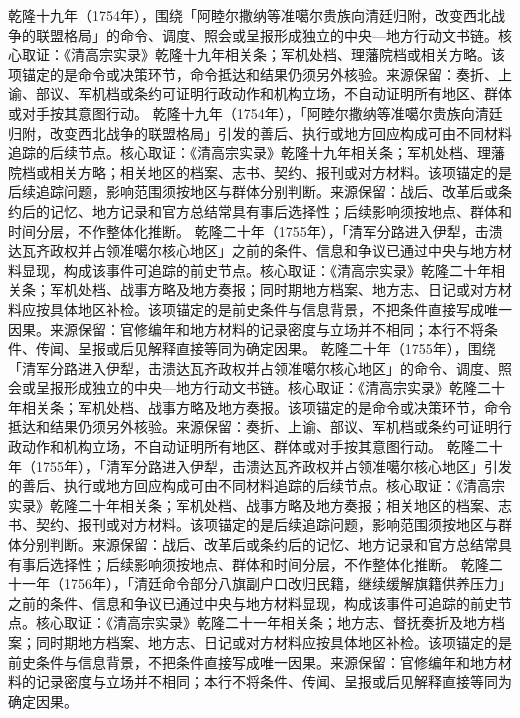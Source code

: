 乾隆十九年（1754年），围绕「阿睦尔撒纳等准噶尔贵族向清廷归附，改变西北战争的联盟格局」的命令、调度、照会或呈报形成独立的中央—地方行动文书链。核心取证：《清高宗实录》乾隆十九年相关条；军机处档、理藩院档或相关方略。该项锚定的是命令或决策环节，命令抵达和结果仍须另外核验。来源保留：奏折、上谕、部议、军机档或条约可证明行政动作和机构立场，不自动证明所有地区、群体或对手按其意图行动。
乾隆十九年（1754年），「阿睦尔撒纳等准噶尔贵族向清廷归附，改变西北战争的联盟格局」引发的善后、执行或地方回应构成可由不同材料追踪的后续节点。核心取证：《清高宗实录》乾隆十九年相关条；军机处档、理藩院档或相关方略；相关地区的档案、志书、契约、报刊或对方材料。该项锚定的是后续追踪问题，影响范围须按地区与群体分别判断。来源保留：战后、改革后或条约后的记忆、地方记录和官方总结常具有事后选择性；后续影响须按地点、群体和时间分层，不作整体化推断。
乾隆二十年（1755年），「清军分路进入伊犁，击溃达瓦齐政权并占领准噶尔核心地区」之前的条件、信息和争议已通过中央与地方材料显现，构成该事件可追踪的前史节点。核心取证：《清高宗实录》乾隆二十年相关条；军机处档、战事方略及地方奏报；同时期地方档案、地方志、日记或对方材料应按具体地区补检。该项锚定的是前史条件与信息背景，不把条件直接写成唯一因果。来源保留：官修编年和地方材料的记录密度与立场并不相同；本行不将条件、传闻、呈报或后见解释直接等同为确定因果。
乾隆二十年（1755年），围绕「清军分路进入伊犁，击溃达瓦齐政权并占领准噶尔核心地区」的命令、调度、照会或呈报形成独立的中央—地方行动文书链。核心取证：《清高宗实录》乾隆二十年相关条；军机处档、战事方略及地方奏报。该项锚定的是命令或决策环节，命令抵达和结果仍须另外核验。来源保留：奏折、上谕、部议、军机档或条约可证明行政动作和机构立场，不自动证明所有地区、群体或对手按其意图行动。
乾隆二十年（1755年），「清军分路进入伊犁，击溃达瓦齐政权并占领准噶尔核心地区」引发的善后、执行或地方回应构成可由不同材料追踪的后续节点。核心取证：《清高宗实录》乾隆二十年相关条；军机处档、战事方略及地方奏报；相关地区的档案、志书、契约、报刊或对方材料。该项锚定的是后续追踪问题，影响范围须按地区与群体分别判断。来源保留：战后、改革后或条约后的记忆、地方记录和官方总结常具有事后选择性；后续影响须按地点、群体和时间分层，不作整体化推断。
乾隆二十一年（1756年），「清廷命令部分八旗副户口改归民籍，继续缓解旗籍供养压力」之前的条件、信息和争议已通过中央与地方材料显现，构成该事件可追踪的前史节点。核心取证：《清高宗实录》乾隆二十一年相关条；地方志、督抚奏折及地方档案；同时期地方档案、地方志、日记或对方材料应按具体地区补检。该项锚定的是前史条件与信息背景，不把条件直接写成唯一因果。来源保留：官修编年和地方材料的记录密度与立场并不相同；本行不将条件、传闻、呈报或后见解释直接等同为确定因果。
